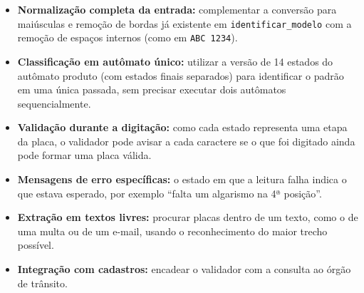 \begin{itemize}
  \item \textbf{Normalização completa da entrada:} complementar a
        conversão para maiúsculas e remoção de bordas já existente
        em \texttt{identificar\_modelo} com a remoção de espaços
        internos (como em \texttt{ABC 1234}).
  \item \textbf{Classificação em autômato único:} utilizar a versão
        de 14 estados do autômato produto (com estados finais
        separados) para identificar o padrão em uma única passada,
        sem precisar executar dois autômatos sequencialmente.
  \item \textbf{Validação durante a digitação:} como cada estado
        representa uma etapa da placa, o validador pode avisar a
        cada caractere se o que foi digitado ainda pode formar uma
        placa válida.
  \item \textbf{Mensagens de erro específicas:} o estado em que a
        leitura falha indica o que estava esperado, por exemplo
        ``falta um algarismo na 4ª posição''.
  \item \textbf{Extração em textos livres:} procurar placas dentro
        de um texto, como o de uma multa ou de um e-mail, usando o
        reconhecimento do maior trecho possível.
  \item \textbf{Integração com cadastros:} encadear o validador com
        a consulta ao órgão de trânsito.
\end{itemize}
